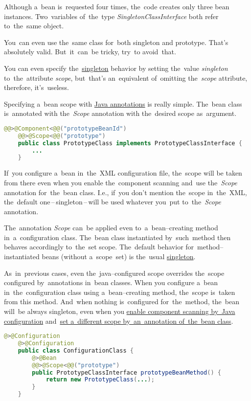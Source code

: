 \noindent Although a~bean is~requested four times, the~code creates only three bean instances.
Two~variables of~the~type \textit{SingletonClassInterface} both refer to~the~same object.

\note You~can even use the~same class for~both singleton and prototype.
That's absolutely valid.
But~it~can~be tricky, try~to avoid~that.

\note You can even specify the~\hyperref[singletondp]{singleton} behavior by setting the~value \textit{singleton} to~the~attribute \textit{scope}, but~that's an~equivalent of~omitting the~\textit{scope} attribute, therefore, it's~useless.

\label{bsannotations}
Specifying a~bean scope with \hyperref[javaannotation]{Java annotations} is really simple.
The~bean class is~annotated with the~\textit{Scope} annotation with the~desired scope as~argument.

\example
\begin{lstlisting}[language=Java, title={Bean class with the prototype scope set by the annotation}]@@>@Component<@@("prototypeBeanId")
    @@>@Scope<@@("prototype")
    public class PrototypeClass implements PrototypeClassInterface {
        ...
    }
\end{lstlisting}

\warning If~you configure a~bean in~the~XML configuration file, the~scope will be taken from there even when you enable the~component scanning and~use the~\textit{Scope} annotation for~the~bean class.
I.e., if~you don't mention the~scope in~the~XML, the~default one\,--\,singleton\,--\,will be used whatever you~put to~the~\textit{Scope} annotation.

The~annotation \textit{Scope} can~be applied even to~a~bean--creating method in~a~configuration class.
The~bean class instantiated by~such~method then behaves accordingly to~the~set scope.
The~default behavior for~method--instantiated beans (without a~scope~set) is the~usual \hyperref[singletondp]{singleton}.

\warning As~in~previous cases, even the~java--configured scope overrides the~scope configured by~annotations in~bean classes.
When you configure a~bean in~the~configuration class using a~bean--creating method, the~scope is~taken from this method.
And~when nothing is~configured for~the~method, the~bean will~be always singleton, even when you \hyperref[iocnoxml]{enable component scanning by~Java configuration} and~\hyperref[bsannotations]{set a~different scope by~an~annotation of~the~bean class}.

\example
\enlargethispage{10mm}
\thispagestyle{empty}
\begin{lstlisting}[language=Java, title={Configuration class with a prototype bean--creating metod}]@>@Configuration
    @>@Configuration
    public class ConfigurationClass {
        @>@Bean
        @@>@Scope<@@("prototype")
        public PrototypeClassInterface prototypeBeanMethod() {
            return new PrototypeClass(...);
        }
    }
\end{lstlisting}
\newpage
